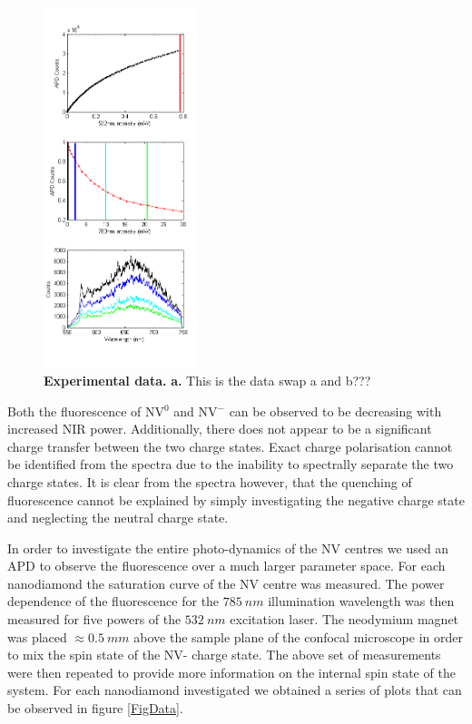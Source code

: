 \documentclass[prl]{revtex4}
\begin{document}
\begin{figure}[H]
  \centering
  \includegraphics[width=0.4\textwidth]{Spectras.png} 
 \caption{\textbf{Experimental data.} \textbf{a.} This is the data swap a and b???} \label{FigSpectra}
\end{figure}

Both the fluorescence of NV$^0$ and NV$^-$ can be observed to be decreasing with increased NIR power. Additionally, there does not appear to be a significant charge transfer between the two charge states. Exact charge polarisation cannot be identified from the spectra due to the inability to spectrally separate the two charge states. It is clear from the spectra however, that the quenching of fluorescence cannot be explained by simply investigating the negative charge state and neglecting the neutral charge state.

In order to investigate the entire photo-dynamics of the NV centres we used an APD to observe the fluorescence over a much larger parameter space. For each nanodiamond the saturation curve of the NV centre was measured. The power dependence of the fluorescence for the $\SI{785}{nm}$ illumination wavelength was then measured for five powers of the $\SI{532}{nm}$ excitation laser. The neodymium magnet was placed $\approx \SI{0.5}{mm}$ above the sample plane of the confocal microscope in order to mix the spin state of the NV- charge state. The above set of measurements were then repeated to provide more information on the internal spin state of the system. For each nanodiamond investigated we obtained a series of plots that can be observed in figure \ref{FigData}.
\end{document}
